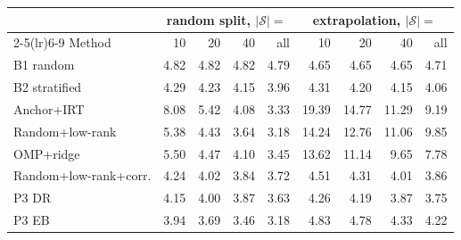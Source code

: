 {\scriptsize\setlength{\tabcolsep}{3pt}
\begin{tabular}{lrrrrrrrr}
\toprule
 & \multicolumn{4}{c}{random split, $|\mathcal S|=$} & \multicolumn{4}{c}{extrapolation, $|\mathcal S|=$} \\
\cmidrule(lr){2-5}\cmidrule(lr){6-9}
Method & 10 & 20 & 40 & all & 10 & 20 & 40 & all \\
\midrule
B1 random & 4.82 & 4.82 & 4.82 & 4.79 & 4.65 & 4.65 & 4.65 & 4.71 \\
B2 stratified & 4.29 & 4.23 & 4.15 & 3.96 & 4.31 & 4.20 & 4.15 & 4.06 \\
Anchor+IRT & 8.08 & 5.42 & 4.08 & 3.33 & 19.39 & 14.77 & 11.29 & 9.19 \\
Random+low-rank & 5.38 & 4.43 & 3.64 & 3.18 & 14.24 & 12.76 & 11.06 & 9.85 \\
OMP+ridge & 5.50 & 4.47 & 4.10 & 3.45 & 13.62 & 11.14 & 9.65 & 7.78 \\
Random+low-rank+corr. & 4.24 & 4.02 & 3.84 & 3.72 & 4.51 & 4.31 & 4.01 & 3.86 \\
P3 DR & 4.15 & 4.00 & 3.87 & 3.63 & 4.26 & 4.19 & 3.87 & 3.75 \\
P3 EB & 3.94 & 3.69 & 3.46 & 3.18 & 4.83 & 4.78 & 4.33 & 4.22 \\
\bottomrule
\end{tabular}}

